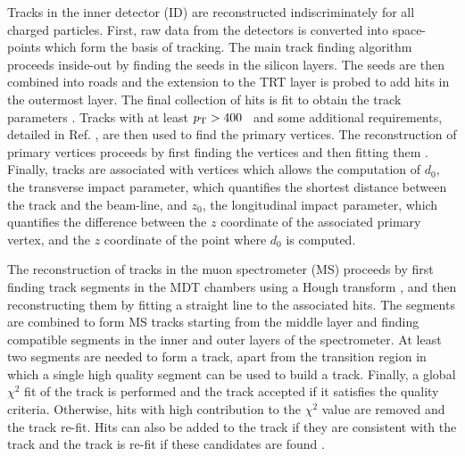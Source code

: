 Tracks in the inner detector (ID) are reconstructed indiscriminately for
all charged particles. First, raw data from the detectors is converted
into space-points which form the basis of tracking. The main track finding
algorithm proceeds inside-out by finding the seeds in the silicon layers.
The seeds are then combined into roads and the extension to the TRT layer
is probed to add hits in the outermost layer. The final collection of hits
is fit to obtain the track parameters \cite{ATLAS-CONF-2010-072, Cornelissen:1020106}.
Tracks with at least $p_{\text{T}} > 400$ \MeV~and some additional requirements, detailed
in Ref. \cite{ATL-PHYS-PUB-2015-026}, are then used to find the primary
vertices. The reconstruction of primary vertices proceeds by first finding
the vertices and then fitting them \cite{Aaboud:2016rmg}. Finally, tracks
are associated with vertices which allows the computation of $d_0$, the
transverse impact parameter, which quantifies the shortest distance
between the track and the beam-line, and $z_0$, the longitudinal impact
parameter, which quantifies the difference between the $z$ coordinate
of the associated primary vertex, and the $z$ coordinate of the point
where $d_0$ is computed.

The reconstruction of tracks in the muon spectrometer (MS) proceeds by
first finding track segments in the MDT chambers using a Hough transform
\cite{ILLINGWORTH198887}, and then reconstructing them by fitting a
straight line to the associated hits. The segments are combined to
form MS tracks starting from the middle layer and finding compatible
segments in the inner and outer layers of the spectrometer. At least two
segments are needed to form a track, apart from the transition region
in which a single high quality segment can be used to build a track.
Finally, a global $\chi^2$ fit of the track is performed and the track
accepted if it satisfies the quality criteria. Otherwise, hits with 
high contribution to the $\chi^2$ value are removed and the track re-fit.
Hits can also be added to the track if they are consistent with the
track and the track is re-fit if these candidates are found \cite{Aad:2016jkr}.

